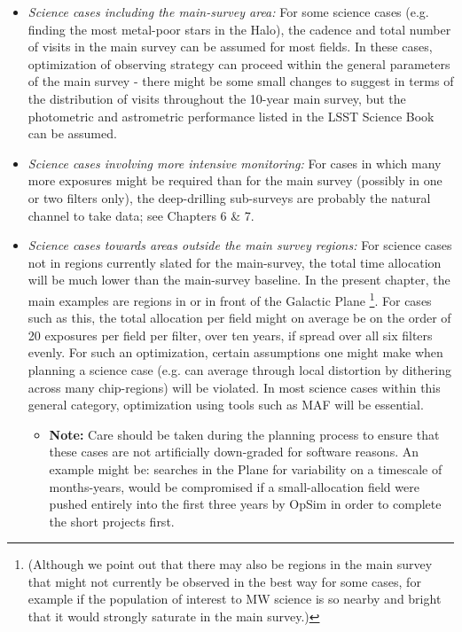 \begin{itemize}
\item {\it Science cases including the main-survey area:} For some
  science cases (e.g. finding the most metal-poor stars in the Halo),
  the cadence and total number of visits in the main survey can be
  assumed for most fields. In these cases, optimization of observing
  strategy can proceed within the general parameters of the main
  survey - there might be some small changes to suggest in terms of
  the distribution of visits throughout the 10-year main survey, but
  the photometric and astrometric performance listed in the LSST
  Science Book can be assumed.
\item {\it Science cases involving more intensive monitoring:} For
  cases in which many more exposures might be required than for the
  main survey (possibly in one or two filters only), the deep-drilling
  sub-surveys are probably the natural channel to take data; see
  Chapters 6 \& 7.
\item {\it Science cases towards areas outside the main survey
  regions:} For science cases not in regions currently slated for the
  main-survey, the total time allocation will be much lower than the
  main-survey baseline. In the present chapter, the main examples are regions in or in front of the Galactic Plane \footnote{(Although we point out that there may
  also be regions in the main survey that might not currently be
  observed in the best way for some cases, for example if the
  population of interest to MW science is so nearby and bright that it
  would strongly saturate in the main survey.)}. For cases such as this,
  the total allocation per field might on average be on the order of
  20 exposures per field per filter, over ten years, if spread over
  all six filters evenly. For such an optimization, certain
  assumptions one might make when planning a science case (e.g. can
  average through local distortion by dithering across many
  chip-regions) will be violated. In most science cases within this
  general category, optimization using tools such as MAF will be
  essential.
  \begin{itemize}
    \item {\bf Note:} Care should be taken during the planning process
      to ensure that these cases are not artificially down-graded for
      software reasons. An example might be: searches in the Plane for
      variability on a timescale of months-years, would be compromised
      if a small-allocation field were pushed entirely into the first
      three years by OpSim in order to complete the short projects
      first.
    \end{itemize}
\end{itemize}


